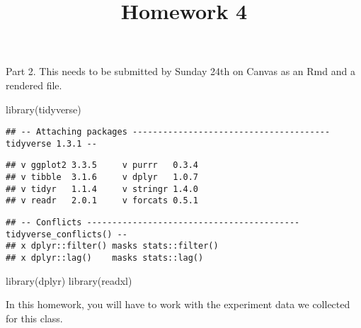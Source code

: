 \documentclass[
]{article}
\title{Homework 4}
\author{}
\date{\vspace{-2.5em}}
\newenvironment{Shaded}{\begin{snugshade}}{\end{snugshade}}
\newcommand{\FunctionTok}[1]{\textcolor[rgb]{0.00,0.00,0.00}{#1}}
\newcommand{\NormalTok}[1]{#1}
\begin{document}
\maketitle

Part 2. This needs to be submitted by Sunday 24th on Canvas as an Rmd
and a rendered file.

\begin{Shaded}
\begin{Highlighting}[]
\FunctionTok{library}\NormalTok{(tidyverse)}
\end{Highlighting}
\end{Shaded}

\begin{verbatim}
## -- Attaching packages --------------------------------------- tidyverse 1.3.1 --
\end{verbatim}

\begin{verbatim}
## v ggplot2 3.3.5     v purrr   0.3.4
## v tibble  3.1.6     v dplyr   1.0.7
## v tidyr   1.1.4     v stringr 1.4.0
## v readr   2.0.1     v forcats 0.5.1
\end{verbatim}

\begin{verbatim}
## -- Conflicts ------------------------------------------ tidyverse_conflicts() --
## x dplyr::filter() masks stats::filter()
## x dplyr::lag()    masks stats::lag()
\end{verbatim}

\begin{Shaded}
\begin{Highlighting}[]
\FunctionTok{library}\NormalTok{(dplyr)}
\FunctionTok{library}\NormalTok{(readxl)}
\end{Highlighting}
\end{Shaded}

In this homework, you will have to work with the experiment data we
collected for this class.
\end{document}
